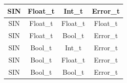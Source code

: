 \begin{figure}[H]
\begin{tabular}{cccc}
        \midrule SIN & Float\_t & Int\_t    & Error\_t \\
        \midrule SIN & Float\_t & Float\_t  & Float\_t \\
        \midrule SIN & Float\_t & Bool\_t   & Error\_t \\

        \midrule SIN & Bool\_t & Int\_t     & Error\_t \\
        \midrule SIN & Bool\_t & Float\_t   & Error\_t \\
        \midrule SIN & Bool\_t & Bool\_t    & Error\_t \\

        \bottomrule
    \end{tabular}\\
\end{figure}

\newpage

